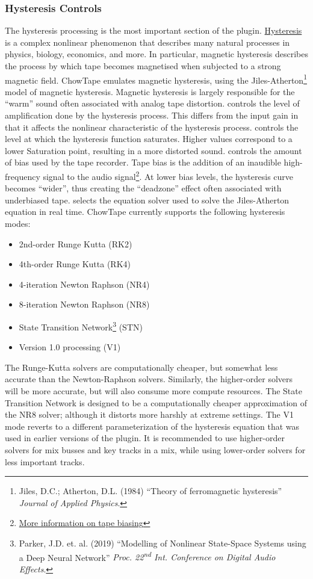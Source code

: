 \documentclass[landscape,twocolumn,a5paper]{manual}
\begin{document}
\subsubsection{Hysteresis Controls}
The hysteresis processing is the most important section of the
plugin. \href{https://en.wikipedia.org/wiki/Hysteresis}{Hysteresis}
is a complex nonlinear phenomenon that describes many
natural processes in physics, biology, economics, and more.
In particular, magnetic hysteresis describes the process by
which tape becomes magnetised when subjected to a strong magnetic
field. ChowTape emulates magnetic hysteresis, using the
Jiles-Atherton\footnote{Jiles, D.C.; Atherton, D.L. (1984) ``Theory of ferromagnetic hysteresis'' \textit{Journal of Applied Physics}.}
model of magnetic hysteresis. Magnetic hysteresis is largely
responsible for the ``warm'' sound often associated with
analog tape distortion.
\newpar
{} controls the level of amplification done by
the hysteresis process. This differs from the input gain in that
it affects the nonlinear characteristic of the hysteresis process.
\newpar
{} controls the level at which the hysteresis
function saturates. Higher values correspond to a lower Saturation
point, resulting in a more distorted sound.
\newpar
{} controls the amount of bias used by the tape
recorder. Tape bias is the addition of an inaudible high-frequency
signal to the audio signal\footnote{\href{https://hccc.org.uk/acbias.html}{More information on tape biasing}}.
At lower bias levels, the hysteresis curve becomes ``wider'',
thus creating the ``deadzone'' effect often associated with
underbiased tape.
\newpar
{} selects the equation solver used
to solve the Jiles-Atherton equation in real time. ChowTape
currently supports the following hysteresis modes:
\renewcommand{\labelitemi}{\textendash}
\begin{itemize}
    \itemsep-1mm
    \item 2nd-order Runge Kutta (RK2)
    \item 4th-order Runge Kutta (RK4)
    \item 4-iteration Newton Raphson (NR4)
    \item 8-iteration Newton Raphson (NR8)
    \item State Transition Network\footnote{Parker, J.D. et. al. (2019) ``Modelling of Nonlinear State-Space Systems using a Deep Neural Network'' \textit{Proc. 22\textsuperscript{nd} Int. Conference on Digital Audio Effects}.} (STN)
    \item Version 1.0 processing (V1)
\end{itemize}
%
The Runge-Kutta solvers are computationally cheaper, but
somewhat less accurate than the Newton-Raphson solvers.
Similarly, the higher-order solvers will be more accurate,
but will also consume more compute resources. The State
Transition Network is designed to be a computationally
cheaper approximation of the NR8 solver; although it
distorts more harshly at extreme settings. The V1 mode
reverts to a different parameterization of the hysteresis
equation that was used in earlier versions of the plugin. It
is recommended to use higher-order solvers for mix busses
and key tracks in a mix, while using lower-order solvers for
less important tracks.
\end{document}
